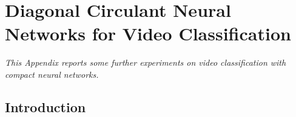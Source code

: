 \chapter{Diagonal Circulant Neural Networks for Video Classification}
\label{appendix:ap2-diagonal_circulant_neural_networks_for_video_classification}
\localtoc

\noindent
\emph{This Appendix reports some further experiments on video classification with compact neural networks.}


\section{Introduction}
\label{section:ap2-introduction}


